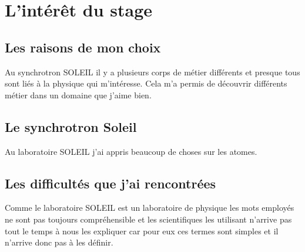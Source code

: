 \chapter{L'intérêt du stage}
	
	\minitoc
	





\section{Les raisons de mon choix}
    Au synchrotron SOLEIL il y a plusieurs corps de métier différents et presque tous sont liés à la physique qui m'intéresse. Cela m'a permis de découvrir différents métier dans un domaine que j'aime bien.
	
\section{Le synchrotron Soleil}
    Au laboratoire SOLEIL j'ai appris beaucoup de choses sur les atomes.

\section{Les difficultés que j'ai rencontrées}
    Comme le laboratoire SOLEIL est un laboratoire de physique les mots employés ne sont pas toujours compréhensible et les scientifiques les utilisant n'arrive pas tout le temps à nous les expliquer car pour eux ces termes sont simples et il n'arrive donc pas à les définir. 


